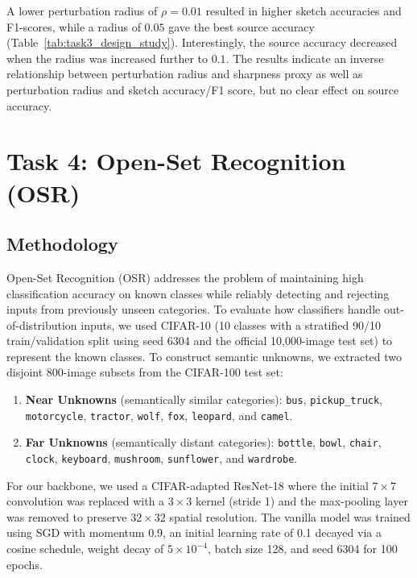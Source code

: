 \documentclass{article}
\begin{document}
A lower perturbation radius of $\rho = 0.01$ resulted in higher sketch accuracies and F1-scores, while a radius of $0.05$ gave the best source accuracy (Table~\ref{tab:task3_design_study}). Interestingly, the source accuracy decreased when the radius was increased further to $0.1$. The results indicate an inverse relationship between perturbation radius and sharpness proxy as well as perturbation radius and sketch accuracy/F1 score, but no clear effect on source accuracy.


\newpage
\section{Task 4: Open-Set Recognition (OSR)}
\label{sec:task4}

\subsection{Methodology}
Open-Set Recognition (OSR) addresses the problem of maintaining high classification accuracy on known classes while reliably detecting and rejecting inputs from previously unseen categories. To evaluate how classifiers handle out-of-distribution inputs, we used CIFAR-10 (10 classes with a stratified 90/10 train/validation split using seed 6304 and the official 10,000-image test set) to represent the known classes. To construct semantic unknowns, we extracted two disjoint 800-image subsets from the CIFAR-100 test set:
\begin{enumerate}
    \item \textbf{Near Unknowns} (semantically similar categories): \texttt{bus}, \texttt{pickup\_truck}, \texttt{motorcycle}, \texttt{tractor}, \texttt{wolf}, \texttt{fox}, \texttt{leopard}, and \texttt{camel}.
    \item \textbf{Far Unknowns} (semantically distant categories): \texttt{bottle}, \texttt{bowl}, \texttt{chair}, \texttt{clock}, \texttt{keyboard}, \texttt{mushroom}, \texttt{sunflower}, and \texttt{wardrobe}.
\end{enumerate}

For our backbone, we used a CIFAR-adapted ResNet-18 where the initial $7 \times 7$ convolution was replaced with a $3 \times 3$ kernel (stride 1) and the max-pooling layer was removed to preserve $32 \times 32$ spatial resolution. The vanilla model was trained using SGD with momentum 0.9, an initial learning rate of 0.1 decayed via a cosine schedule, weight decay of $5 \times 10^{-4}$, batch size 128, and seed 6304 for 100 epochs.
\end{document}
